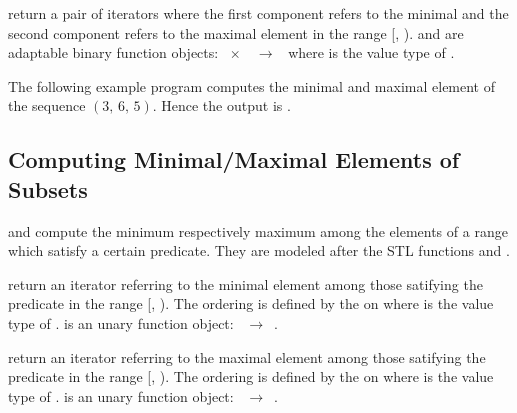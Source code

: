  {return a pair of iterators where the first
  component refers to the minimal and the second component refers to the
  maximal element in the range [, ).  and
   are adaptable binary function objects:
  ~$\times$~~$\to$~ where  is the value type
  of .}

\ccExample The following example program computes the minimal and maximal
element of the sequence $(3,\,6,\,5)$. Hence the output is .


\def\ccLongParamLayout{\ccTrue} 

\subsection{Computing Minimal/Maximal Elements of Subsets}
\label{sectionMinElementIf}

 and  compute the minimum
respectively maximum among the elements of a range which satisfy a certain
predicate. They are modeled after the STL functions  and
.


{return an iterator referring to the minimal element among those satifying the
  predicate  in the range [, ). The ordering is
  defined by the  on  where  is the value type
  of .  is an unary function object:
  ~$\to$~.}

{return an iterator referring to the maximal element among those satifying the
  predicate  in the range [, ). The ordering is
  defined by the  on  where  is the value type
  of .  is an unary function object:
  ~$\to$~.}

